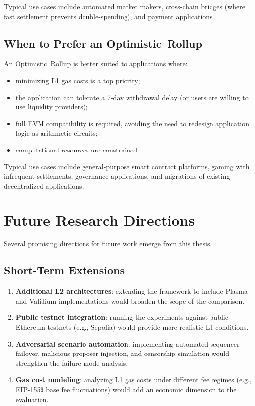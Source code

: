 \documentclass[
]{elteikthesis}[2024/04/26]
\begin{document}
Typical use cases include automated market makers, cross-chain bridges (where fast settlement prevents double-spending), and payment applications.

\subsection{When to Prefer an Optimistic~Rollup}

An Optimistic~Rollup is better suited to applications where:
\begin{itemize}
    \item minimizing L1 gas costs is a top priority;
    \item the application can tolerate a 7-day withdrawal delay (or users are willing to use liquidity providers);
    \item full EVM compatibility is required, avoiding the need to redesign application logic as arithmetic circuits;
    \item computational resources are constrained.
\end{itemize}

Typical use cases include general-purpose smart contract platforms, gaming with infrequent settlements, governance applications, and migrations of existing decentralized applications.

\section{Future Research Directions}

Several promising directions for future work emerge from this thesis.

\subsection{Short-Term Extensions}

\begin{enumerate}
    \item \textbf{Additional L2 architectures}: extending the framework to include Plasma and Validium implementations would broaden the scope of the comparison.
    \item \textbf{Public testnet integration}: running the experiments against public Ethereum testnets (e.g., Sepolia) would provide more realistic L1 conditions.
    \item \textbf{Adversarial scenario automation}: implementing automated sequencer failover, malicious proposer injection, and censorship simulation would strengthen the failure-mode analysis.
    \item \textbf{Gas cost modeling}: analyzing L1 gas costs under different fee regimes (e.g., EIP-1559 base fee fluctuations) would add an economic dimension to the evaluation.
\end{enumerate}
\end{document}
